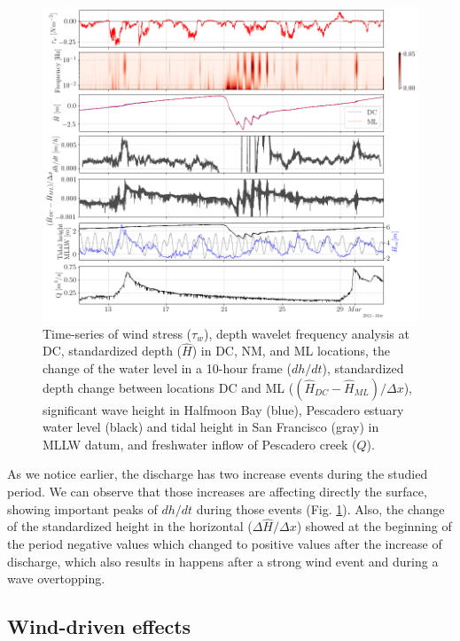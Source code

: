 \documentclass[tesis.tex]{subfiles}
\begin{document}
\begin{figure}[h!]
    \centering
    \includegraphics[width=\textwidth]{Imagenes/surf.png}
    \caption{Time-series of wind stress ($\tau_w$), depth wavelet frequency analysis at DC, standardized depth ($\hat{H}$) in DC, NM, and ML locations, the change of the water level in a 10-hour frame ($dh/dt$), standardized depth change between locations DC and ML ($(\hat{H}_{DC}-\hat{H}_{ML})/\Delta x$), significant wave height in Halfmoon Bay (blue), Pescadero estuary water level (black) and tidal height in San Francisco (gray) in MLLW datum, and freshwater inflow of Pescadero creek ($Q$).}
    \label{fig:surf}
\end{figure}

As we notice earlier, the discharge has two increase events during the studied period. We can observe that those increases are affecting directly the surface, showing important peaks of $dh/dt$ during those events (Fig. \ref{fig:surf}). Also, the change of the standardized height in the horizontal ($\Delta \hat{H}/\Delta x$) showed at the beginning of the period negative values which changed to positive values after the increase of discharge, which also results in happens after a strong wind event and during a wave overtopping.\\

\subsection{Wind-driven effects}
\end{document}
